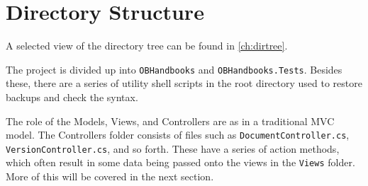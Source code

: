 \section{Directory Structure}
A selected view of the directory tree can be found in \cref{ch:dirtree}.

The project is divided up into \texttt{OBHandbooks} and \texttt{OBHandbooks.Tests}.
Besides these, there are a series of utility shell scripts in the root directory used to restore backups and check the syntax.

The role of the Models, Views, and Controllers are as in a traditional MVC model.
The Controllers folder consists of files such as \texttt{DocumentController.cs}, \texttt{VersionController.cs}, and so forth.
These have a series of action methods, which often result in some data being passed onto the views in the \texttt{Views} folder.
More of this will be covered in the next section.
